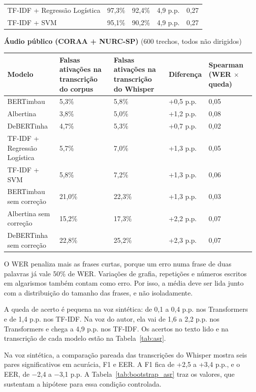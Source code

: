 \documentclass[
    12pt,                %
    openright,           %
    oneside,             %
    a4paper,             %
    english,             %
    brazil               %
]{abntex2}
\begin{document}
\begin{table}[htb]
\begin{tabularx}{\textwidth}{lYYYY}
TF-IDF + Regressão Logística & 97,3\% & 92,4\% & 4,9 p.p. & 0,27 \\
TF-IDF + SVM & 95,1\% & 90,2\% & 4,9 p.p. & 0,27 \\
\bottomrule
\end{tabularx}
\par\vspace{8pt}
\textbf{Áudio público (CORAA + NURC-SP)} (600 trechos, todos não dirigidos)\\[2pt]
\par\vspace{8pt}
\begin{tabularx}{\textwidth}{lYYYY}
\toprule
Modelo & Falsas ativações na transcrição do corpus & Falsas ativações na transcrição do Whisper & Diferença & Spearman (WER $\times$ queda) \\
\midrule
BERTimbau & 5,3\% & 5,8\% & +0,5 p.p. & 0,05 \\
Albertina & 3,8\% & 5,0\% & +1,2 p.p. & 0,08 \\
DeBERTinha & 4,7\% & 5,3\% & +0,7 p.p. & 0,02 \\
TF-IDF + Regressão Logística & 5,7\% & 7,0\% & +1,3 p.p. & 0,05 \\
TF-IDF + SVM & 5,8\% & 7,2\% & +1,3 p.p. & 0,06 \\
BERTimbau sem correção & 21,0\% & 22,3\% & +1,3 p.p. & 0,03 \\
Albertina sem correção & 15,2\% & 17,3\% & +2,2 p.p. & 0,07 \\
DeBERTinha sem correção & 22,8\% & 25,2\% & +2,3 p.p. & 0,07 \\
\bottomrule
\end{tabularx}
\end{table}

O WER penaliza mais as frases curtas, porque um erro numa frase de duas palavras já vale 50\% de WER. Variações de grafia, repetições e números escritos em algarismos também contam como erro. Por isso, a média deve ser lida junto com a distribuição do tamanho das frases, e não isoladamente.

A queda de acerto é pequena na voz sintética: de 0,1 a 0,4 p.p. nos Transformers e de 1,4 p.p. nos TF-IDF. Na voz do autor, ela vai de 1,6 a 2,2 p.p. nos Transformers e chega a 4,9 p.p. nos TF-IDF. Os acertos no texto lido e na transcrição de cada modelo estão na Tabela~\ref{tab:asr}.

Na voz sintética, a comparação pareada das transcrições do Whisper mostra seis pares significativos em acurácia, F1 e EER. A F1 fica de +2,5 a +3,4 p.p., e o EER, de $-$2,4 a $-$3,1 p.p. A Tabela~\ref{tab:bootstrap_asr} traz os valores, que sustentam a hipótese para essa condição controlada.
\end{document}
